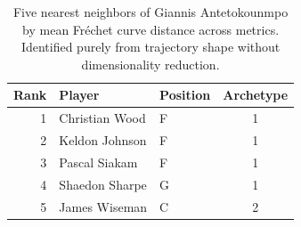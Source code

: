 \begin{table}[htbp]
  \centering\small
  \begin{tabular}{rllc}
    \toprule
    Rank & Player & Position & Archetype \\
    \midrule
    1 & Christian Wood & F & 1 \\
    2 & Keldon Johnson & F & 1 \\
    3 & Pascal Siakam & F & 1 \\
    4 & Shaedon Sharpe & G & 1 \\
    5 & James Wiseman & C & 2 \\
    \bottomrule
  \end{tabular}
  \caption{Five nearest neighbors of Giannis Antetokounmpo by mean Fr\'{e}chet curve distance across metrics. Identified purely from trajectory shape without dimensionality reduction.}
  \label{tab:Giannis_Antetokounmpo_frechet_curve_neighbors}
\end{table}

